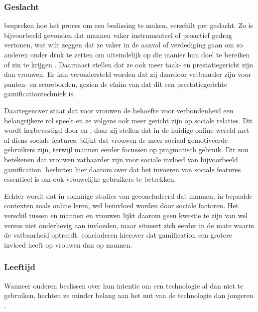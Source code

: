 \subsubsection{Geslacht}

\textcite{Venkatesh2000} bespreken hoe het proces om een beslissing te maken, verschilt per geslacht. Zo is bijvoorbeeld gevonden dat mannen vaker instrumenteel of proactief gedrag vertonen, wat wilt zeggen dat ze vaker in de aanval of verdediging gaan om zo anderen onder druk te zetten om uiteindelijk op die manier hun doel te bereiken of zin te krijgen \autocite{Spence1980}. Daarnaast stellen \textcite{Hoffman1972, Minton1980} dat ze ook meer taak- en prestatiegericht zijn dan vrouwen.
Er kan verondersteld worden dat zij daardoor vatbaarder zijn voor punten- en scoreborden, gezien de claim van \textcite{Hamari2014} dat dit een prestatiegerichte gamificationtechniek is.

Daartegenover staat dat voor vrouwen de behoefte voor verbondenheid een belangrijkere rol speelt \autocite{Hoffman1972} en ze volgens \textcite{Minton1980, Spence1980} ook meer gericht zijn op sociale relaties. Dit wordt herbevestigd door \textcite{Haferkamp2012} en \textcite{Muscanell2012}, daar zij stellen dat in de huidige online wereld met al diens sociale features, blijkt dat vrouwen de meer sociaal gemotiveerde gebruikers zijn, terwijl mannen eerder focussen op pragmatisch gebruik. Dit zou betekenen dat vrouwen vatbaarder zijn voor sociale invloed van bijvoorbeeld gamification. \textcite{Koivisto2014} besluiten hier daarom over dat het invoeren van sociale features essentieel is om ook vrouwelijke gebruikers te betrekken.

Echter wordt dat in sommige studies van \textcite{Wang2008} geconcludeerd dat mannen, in bepaalde contexten zoals online leren, wel beïnvloed worden door sociale factoren. Het verschil tussen en mannen en vrouwen lijkt daarom geen kwestie te zijn van wel versus niet onderhevig aan invloeden, maar situeert zich eerder in de mate waarin de vatbaarheid optreedt. \textcite{PoloPena2020} concluderen hierover dat gamification een grotere invloed heeft op vrouwen dan op mannen.

\subsubsection{Leeftijd}

Wanneer ouderen beslissen over hun intentie om een technologie al dan niet te gebruiken, hechten ze minder belang aan het nut van de technologie dan jongeren \autocite{Venkatesh2003}.

